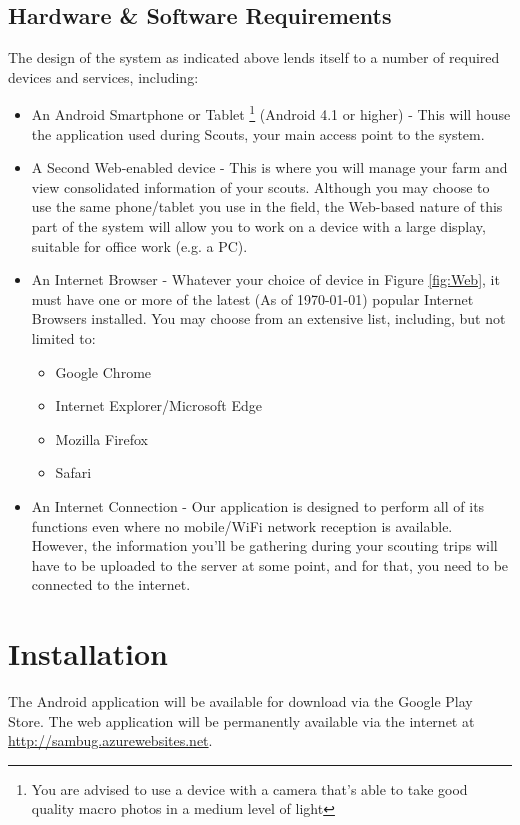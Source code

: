 \documentclass[11pt,a4paper,titlepage]{article}
\begin{document}
\subsection{Hardware \& Software Requirements}
The design of the system as indicated above lends itself to a number of required devices and services, including:
	\begin{itemize}
		\item An Android Smartphone or Tablet \footnote{You are advised to use a device with a camera that's able to take good quality macro photos in a medium level of light} (Android 4.1 or higher) - This will house the application used during Scouts, your main access point to the system.
		\item A Second Web-enabled device - This is where you will manage your farm and view consolidated information of your scouts. Although you may choose to use the same phone/tablet you use in the field, the Web-based nature of this part of the system will allow you to work on a device with a large display, suitable for office work (e.g. a PC).
		\item An Internet Browser - Whatever your choice of device in Figure \ref{fig:Web}, it must have one or more of the latest (As of \monthyeardate\today) popular Internet Browsers installed. You may choose from an extensive list, including, but not limited to:
		\begin{itemize}
			\item Google Chrome
			\item Internet Explorer/Microsoft Edge
			\item Mozilla Firefox
			\item Safari
		\end{itemize}
		\item An Internet Connection - Our application is designed to perform all of its functions even where no mobile/WiFi network reception is available. However, the information you'll be gathering during your scouting trips will have to be uploaded to the server at some point, and for that, you need to be connected to the internet. 		
	\end{itemize}

\section{Installation}
The Android application will be available for download via the Google Play Store. The web application will be permanently available via the internet at \url{http://sambug.azurewebsites.net}.\\
\end{document}
